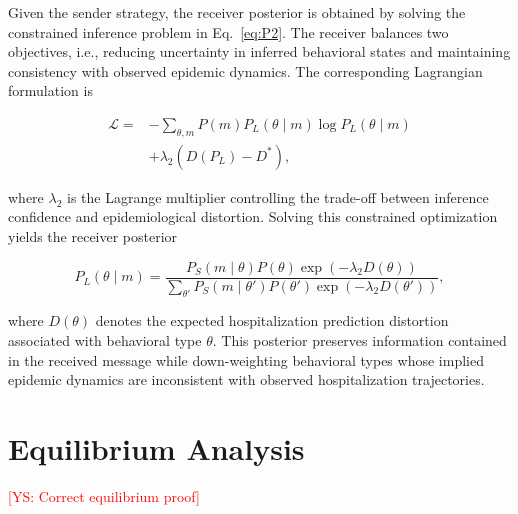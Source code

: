 \documentclass[sigconf,review]{acmart}
\newcommand{\ys}[1]{\textcolor{red}{[YS: #1]}}
\begin{document}
Given the sender strategy, the receiver posterior is obtained by solving
the constrained inference problem in Eq.~\eqref{eq:P2}. The receiver balances two objectives, i.e., reducing uncertainty in inferred behavioral states and maintaining consistency with observed epidemic dynamics.
The corresponding Lagrangian formulation is

\begin{equation}
\begin{aligned}
\mathcal{L}
=&
-\sum_{\theta,m}
P(m)P_L(\theta\mid m)
\log P_L(\theta\mid m)
\\
&
+\lambda_2
\left(
D(P_L)-D^*
\right),
\end{aligned}
\label{eq:Lagrangian_receiver}
\end{equation}

where $\lambda_2$ is the Lagrange multiplier controlling the trade-off between inference confidence and epidemiological distortion.
Solving this constrained optimization yields the receiver posterior

\begin{equation}
P_L(\theta\mid m)
=
\frac{
P_S(m\mid\theta)P(\theta)
\exp(-\lambda_2D(\theta))
}
{
\sum_{\theta'}
P_S(m\mid\theta')
P(\theta')
\exp(-\lambda_2D(\theta'))
},
\label{eq:posterior_solution}
\end{equation}

where $D(\theta)$ denotes the expected hospitalization prediction distortion associated with behavioral type $\theta$. This posterior preserves information contained in the received message
while down-weighting behavioral types whose implied epidemic dynamics
are inconsistent with observed hospitalization trajectories.


\section{Equilibrium Analysis}
\ys{Correct equilibrium proof}

\end{document}
